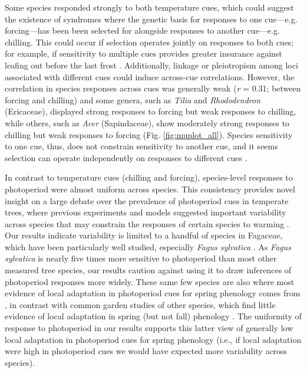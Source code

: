 \documentclass[11pt]{article}
\begin{document}
Some species responded strongly to both temperature cues, which could suggest the existence of syndromes where the genetic basis for responses to one cue---e.g. forcing---has been been selected for alongside responses to another cue---e.g. chilling. This could occur if selection operates jointly on responses to both cues; for example, if sensitivity to multiple cues provides greater insurance against leafing out before the last frost \citep{bonamour2019,memegan2021}. Additionally, linkage or pleiotropism among loci associated with different cues \citep{nakagawa2005} could induce across-cue correlations. However, the correlation in species responses across cues was generally weak (\emph{r} = 0.31; between forcing and chilling) and some genera, such as \emph{Tilia} and \emph{Rhododendron} (Ericaceae), displayed strong responses to forcing but weak responses to chilling, while others, such as \emph{Acer} (Sapindaceae), show moderately strong responses to chilling but weak responses to forcing (Fig. \ref{fig:muplot_all}). Species sensitivity to one cue, thus, does not constrain sensitivity to another cue, and it seems selection can operate independently on responses to different cues \citep{bonamour2019}.

In contrast to temperature cues (chilling and forcing), species-level responses to photoperiod were almost uniform across species. This consistency provides novel insight on a large debate over the prevalence of photoperiod cues in temperate trees, where previous experiments \citep{Basler:2012,zohner2016} and models \citep[e.g.,][]{Hunter:1992jw,schaber20203} suggested important variability across species that may constrain the responses of certain species to warming \citep{way2015}. Our results indicate variability is limited to a handful of species in Fagaceae, which have been particularly well studied, especially \emph{Fagus sylvatica} \citep[e.g.,][]{Basler:2012,zohner2016,kramer2017}. As \emph{Fagus sylvatica} is nearly five times more sensitive to photoperiod than most other measured tree species, our results caution against using it to draw inferences of photoperiod responses more widely. These same few species are also where most evidence of local adaptation in photoperiod cues for spring phenology comes from \citep[e.g.,][]{kramer2017}, in contrast with common garden studies of other species, which find little evidence of local adaptation in spring (but not fall) phenology \citep{aitken2016}. The uniformity of response to photoperiod in our results supports this latter view of generally low local adaptation in photoperiod cues for spring phenology (i.e., if local adaptation were high in photoperiod cues we would have expected more variability across species). %
\end{document}

